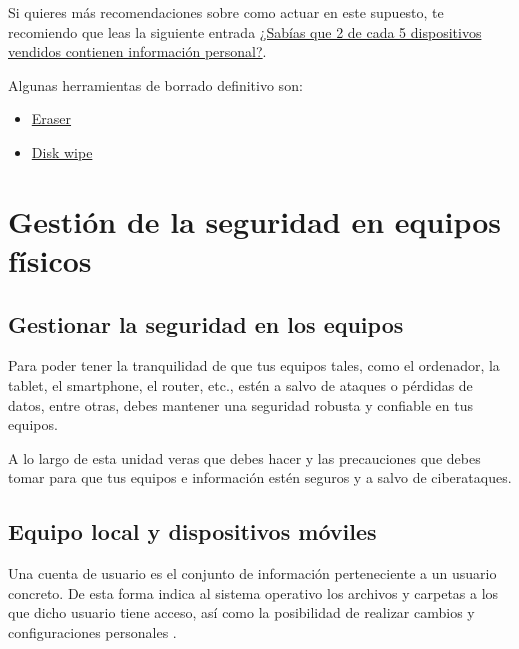 \documentclass[
  a4paper,
  openany]{book}
\begin{document}
Si quieres más recomendaciones sobre como actuar en este supuesto, te recomiendo que leas la siguiente entrada \href{https://www.osi.es/es/actualidad/blog/2019/10/09/sabias-que-2-de-cada-5-dispositivos-vendidos-contienen-informacion}{¿Sabías que 2 de cada 5 dispositivos vendidos contienen información personal?}.

Algunas herramientas de borrado definitivo son:

\begin{itemize}
\item
  \href{https://eraser.heidi.ie/}{Eraser}
\item
  \href{https://www.diskwipe.org/download.php}{Disk wipe}
\end{itemize}

\hypertarget{gestiuxf3n-de-la-seguridad-en-equipos-fuxedsicos}{%
\chapter{Gestión de la seguridad en equipos físicos}\label{gestiuxf3n-de-la-seguridad-en-equipos-fuxedsicos}}

\hypertarget{gestionar-la-seguridad-en-los-equipos}{%
\section{Gestionar la seguridad en los equipos}\label{gestionar-la-seguridad-en-los-equipos}}

Para poder tener la tranquilidad de que tus equipos tales, como el ordenador, la tablet, el smartphone, el router, etc., estén a salvo de ataques o pérdidas de datos, entre otras, debes mantener una seguridad robusta y confiable en tus equipos.

A lo largo de esta unidad veras que debes hacer y las precauciones que debes tomar para que tus equipos e información estén seguros y a salvo de ciberataques.

\hypertarget{equipo-local-y-dispositivos-muxf3viles}{%
\section{Equipo local y dispositivos móviles}\label{equipo-local-y-dispositivos-muxf3viles}}

Una cuenta de usuario es el conjunto de información perteneciente a un usuario concreto. De esta forma indica al sistema operativo los archivos y carpetas a los que dicho usuario tiene acceso, así como la posibilidad de realizar cambios y configuraciones personales \citep{OSI-cuentas}.
\end{document}
